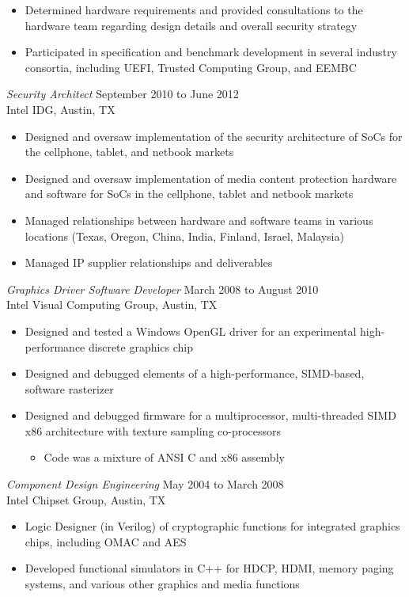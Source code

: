 \documentclass[overlapped]{res}
\begin{document}
\begin{resume}
\begin{itemize}
	\item Determined hardware requirements and provided consultations to the hardware team regarding design details and overall security strategy
	\item Participated in specification and benchmark development in several industry consortia, including UEFI, Trusted Computing Group, and EEMBC
\end{itemize}
{\sl Security Architect} \hfill September 2010 to June 2012 \\
	Intel IDG, Austin, TX
\begin{itemize}
	\item Designed and oversaw implementation of the security architecture of SoCs for the cellphone, tablet, and netbook markets
	\item Designed and oversaw implementation of media content protection hardware and software for SoCs in the cellphone, tablet and netbook markets
	\item Managed relationships between hardware and software teams in various locations (Texas, Oregon, China, India, Finland, Israel, Malaysia) 
	\item Managed IP supplier relationships and deliverables
\end{itemize}
{\sl Graphics Driver Software Developer} \hfill March 2008 to August 2010 \\
	Intel Visual Computing Group, Austin, TX
\begin{itemize}
	\item Designed and tested a Windows OpenGL driver for an experimental high-performance discrete graphics chip
	\item Designed and debugged elements of a high-performance, SIMD-based, software rasterizer
	\item Designed and debugged firmware for a multiprocessor, multi-threaded SIMD x86 architecture with texture sampling co-processors
	\begin{itemize}
		\item Code was a mixture of ANSI C and x86 assembly
	\end{itemize}
\end{itemize}
{\sl Component Design Engineering} \hfill May 2004 to March 2008 \\
	Intel Chipset Group, Austin, TX
\begin{itemize}
	\item Logic Designer (in Verilog) of cryptographic functions for integrated graphics chips, including OMAC and AES
	\item Developed functional simulators in C++ for HDCP, HDMI, memory paging systems, and various other graphics and media functions

\end{itemize}
\end{resume}
\end{document}
